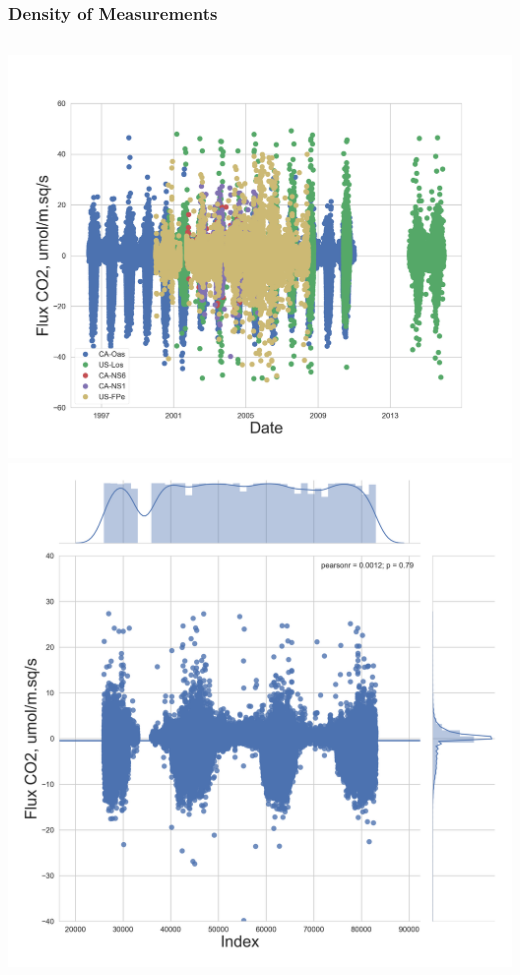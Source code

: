 \documentclass{beamer}
\begin{document}
\begin{frame}
\frametitle{Density of Measurements}

\begin{columns}[t]
\centering
\includegraphics[width=\textwidth]{FvsTimeDen/all.png}\\
\includegraphics[width=\textwidth]{FvsTimeDen/CA-NS1.png}

\end{columns}
\end{frame}
\end{document}
